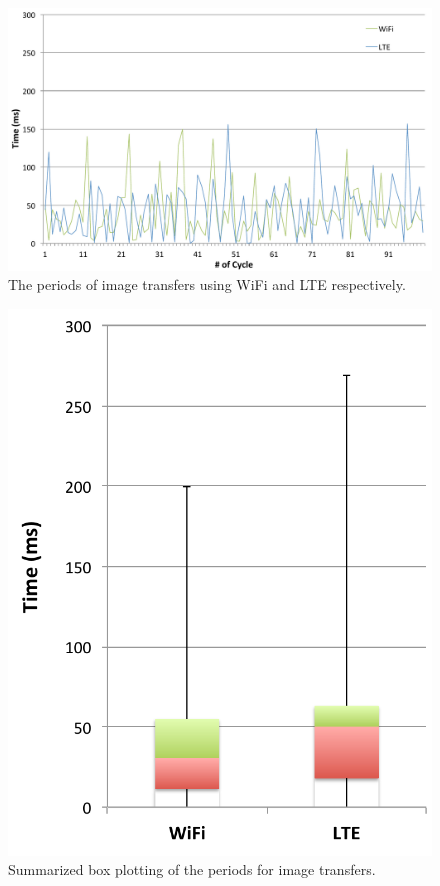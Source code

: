 \begin{figure}[!t]
 \centering
 \includegraphics[width=0.8\hsize]{fig/No12_TIPiC_serv_cycle_compare_WiFi_and_LTE.pdf}
 \caption{The periods of image transfers using WiFi and LTE respectively.}
 \label{fig:no12}
\end{figure}

\begin{figure}[!t]
 \centering
 \includegraphics[width=0.5\hsize]{fig/No13_TIPiC_boxplot_compare_WiFi_and_LTE.pdf}
 \caption{Summarized box plotting of the periods for image transfers.}
 \label{fig:no13}
\end{figure}

